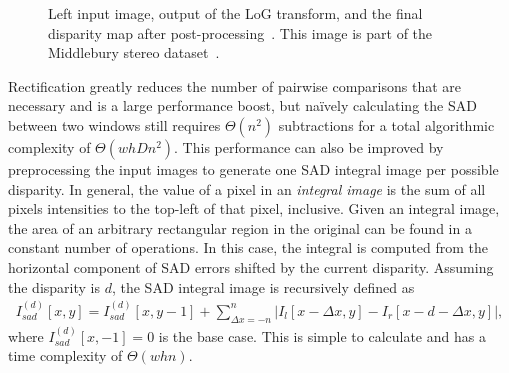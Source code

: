 \documentclass{article}
\newcommand{\abs}[1]{\left|#1\right|}
\begin{document}
\begin{figure}
    \centering
    \caption{
        Left input image, output of the LoG transform, and the final disparity
        map after post-processing~\cite{konolige97}. This image is part of the
        Middlebury stereo dataset~\cite{scharstein2003}.
    }
    \label{fig:images}
\end{figure}

Rectification greatly reduces the number of pairwise comparisons that are
necessary and is a large performance boost, but na\"{i}vely calculating the SAD
between two windows still requires $\Theta(n^2)$ subtractions for a total
algorithmic complexity of $\Theta(whDn^2)$. This performance can also be
improved by preprocessing the input images to generate one SAD integral image
per possible disparity. In general, the value of a pixel in an \textit{integral
image} is the sum of all pixels intensities to the top-left of that pixel, inclusive. Given
an integral image, the area of an arbitrary rectangular region in the original
can be found in a constant number of operations. In this case, the integral is
computed from the horizontal component of SAD errors shifted by the current
disparity. Assuming the disparity is $d$, the SAD integral image is recursively
defined as
\begin{align*}
    I_{sad}^{(d)}[x, y] =
        I_{sad}^{(d)}[x, y - 1]
        + \sum_{\Delta x = -n}^n
          \abs{I_l[x - \Delta x, y] - I_r[x - d - \Delta x, y]},
\end{align*}
where $I_{sad}^{(d)}[x, -1] = 0$ is the base case. This is simple to calculate
and has a time complexity of $\Theta(w h n)$.
\end{document}
